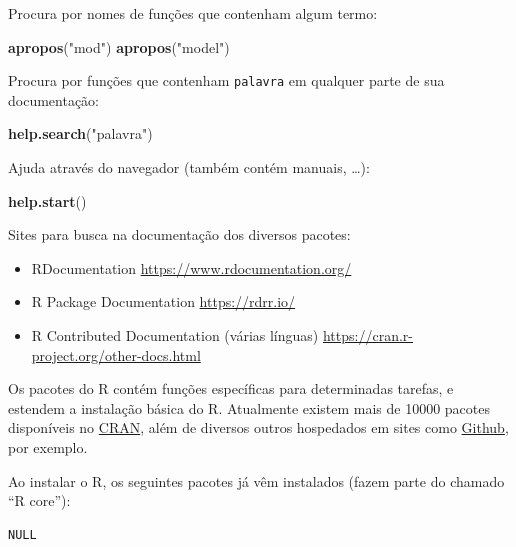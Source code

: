 \documentclass[10pt,a4paper]{book}
\newenvironment{Shaded}{\begin{snugshade}}{\end{snugshade}}
\newcommand{\KeywordTok}[1]{\textcolor[rgb]{0.13,0.29,0.53}{\textbf{#1}}}
\newcommand{\StringTok}[1]{\textcolor[rgb]{0.31,0.60,0.02}{#1}}
\newcommand{\NormalTok}[1]{#1}
\providecommand{\tightlist}{%
  \setlength{\itemsep}{0pt}\setlength{\parskip}{0pt}}
\begin{document}
Procura por nomes de funções que contenham algum termo:

\begin{Shaded}
\begin{Highlighting}[]
\KeywordTok{apropos}\NormalTok{(}\StringTok{"mod"}\NormalTok{)}
\KeywordTok{apropos}\NormalTok{(}\StringTok{"model"}\NormalTok{)}
\end{Highlighting}
\end{Shaded}

Procura por funções que contenham \texttt{palavra} em qualquer parte de
sua documentação:

\begin{Shaded}
\begin{Highlighting}[]
\KeywordTok{help.search}\NormalTok{(}\StringTok{"palavra"}\NormalTok{)}
\end{Highlighting}
\end{Shaded}

Ajuda através do navegador (também contém manuais, \ldots{}):

\begin{Shaded}
\begin{Highlighting}[]
\KeywordTok{help.start}\NormalTok{()}
\end{Highlighting}
\end{Shaded}

Sites para busca na documentação dos diversos pacotes:

\begin{itemize}
\tightlist
\item
  RDocumentation \url{https://www.rdocumentation.org/}
\item
  R Package Documentation \url{https://rdrr.io/}
\item
  R Contributed Documentation (várias línguas)
  \url{https://cran.r-project.org/other-docs.html}
\end{itemize}

Os pacotes do R contém funções específicas para determinadas tarefas, e
estendem a instalação básica do R. Atualmente existem mais de 10000
pacotes disponíveis no
\href{http://cran-r.c3sl.ufpr.br/web/packages/index.html}{CRAN}, além de
diversos outros hospedados em sites como
\href{https://github.com}{Github}, por exemplo.

Ao instalar o R, os seguintes pacotes já vêm instalados (fazem parte do
chamado ``R core''):

\begin{verbatim}
NULL
\end{verbatim}
\end{document}
